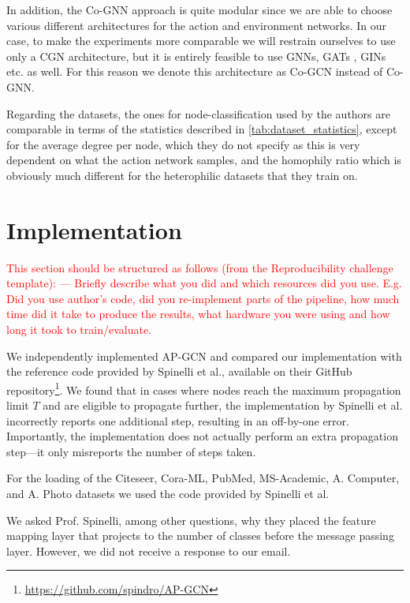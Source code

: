 \documentclass{gdl}
\begin{document}
In addition, the Co-GNN approach is quite modular since we are able to choose various different architectures for the action and environment networks. In our case, to make the experiments more comparable we will restrain ourselves to use only a CGN architecture, but it is entirely feasible to use GNNs, GATs \cite{veličković2018graphattentionnetworks}, GINs \cite{xu2019powerfulgraphneuralnetworks} etc. as well. For this reason we denote this architecture as Co-GCN instead of Co-GNN.

Regarding the datasets, the ones for node-classification used by the authors are comparable in terms of the statistics described in \autoref{tab:dataset_statistics}, except for the average degree per node, which they do not specify as this is very dependent on what the action network samples, and the homophily ratio which is obviously much different for the heterophilic datasets that they train on.

\section{Implementation}

\textcolor{red}{
This section should be structured as follows (from the Reproducibility challenge template):
---
Briefly describe what you did and which resources did you use. E.g. Did you use author's code, did you re-implement parts of the pipeline, how much time did it take to produce the results, what hardware you were using and how long it took to train/evaluate. }

We independently implemented AP-GCN and compared our implementation with the reference code provided by Spinelli et al., available on their GitHub repository\footnote{\url{https://github.com/spindro/AP-GCN}}. We found that in cases where nodes reach the maximum propagation limit $T$ and are eligible to propagate further, the implementation by Spinelli et al. incorrectly reports one additional step, resulting in an off-by-one error. Importantly, the implementation does not actually perform an extra propagation step—it only misreports the number of steps taken.

For the loading of the Citeseer, Cora-ML, PubMed, MS-Academic, A. Computer, and A. Photo datasets we used the code provided by Spinelli et al.

We asked Prof. Spinelli, among other questions, why they placed the feature mapping layer that projects to the number of classes before the message passing layer. However, we did not receive a response to our email.
\end{document}
